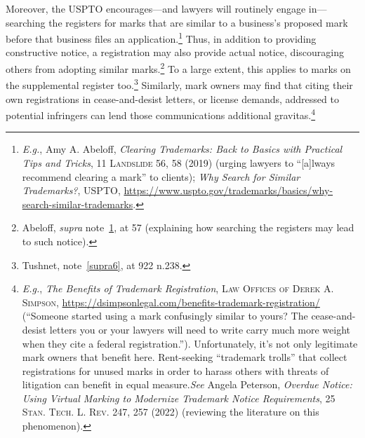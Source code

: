 \documentclass[letterpaper, 11pt, oneside]{article}
\begin{document}
Moreover, the USPTO encourages—and lawyers will routinely engage in—searching the registers for marks that are similar to a business's proposed mark before that business files an application.\footnote{\label{supra9} \textit{E.g.}, Amy A. Abeloff, \textit{Clearing Trademarks: Back to Basics with Practical Tips and Tricks}, 11 \textsc{Landslide} 56, 58 (2019) (urging lawyers to ``[a]lways recommend clearing a mark'' to clients); \textit{Why Search for Similar Trademarks?}, USPTO, \url{https://www.uspto.gov/trademarks/basics/why-search-similar-trademarks}.} Thus, in addition to providing constructive notice, a registration may also provide actual notice, discouraging others from adopting similar marks.\footnote{Abeloff, \textit{supra} note~\ref{supra9}, at 57 (explaining how searching the registers may lead to such notice).} To a large extent, this applies to marks on the supplemental register too.\footnote{Tushnet, note~\ref{supra6}, at 922 n.238.} Similarly, mark owners may find that citing their own registrations in cease-and-desist letters, or license demands, addressed to potential infringers can lend those communications additional gravitas.\footnote{\textit{E.g.}, \textit{The Benefits of Trademark Registration}, \textsc{Law Offices of Derek A. Simpson}, \url{https://dsimpsonlegal.com/benefits-trademark-registration/} (``Someone started using a mark confusingly similar to yours? The cease-and-desist letters you or your lawyers will need to write carry much more weight when they cite a federal registration.''). Unfortunately, it's not only legitimate mark owners that benefit here. Rent-seeking ``trademark trolls'' that collect registrations for unused marks in order to harass others with threats of litigation can benefit in equal measure.\textit{See} Angela Peterson, \textit{Overdue Notice: Using Virtual Marking to Modernize Trademark Notice Requirements}, 25 \textsc{Stan. Tech. L. Rev.} 247, 257 (2022) (reviewing the literature on this phenomenon).}
\end{document}
